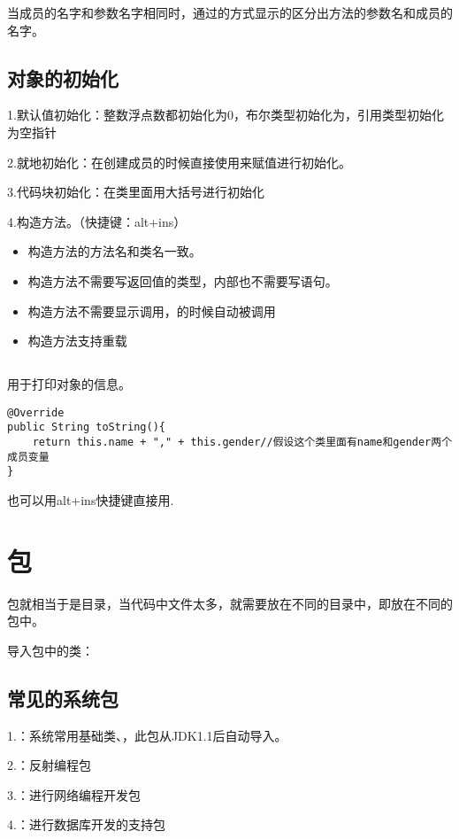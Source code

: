\documentclass[a4paper]{report}
\begin{document}
当成员的名字和参数名字相同时，通过的方式显示的区分出方法的参数名和成员的名字。
\subsection{对象的初始化}
1.默认值初始化：整数浮点数都初始化为0，布尔类型初始化为，引用类型初始化为空指针

2.就地初始化：在创建成员的时候直接使用\dm{=}来赋值进行初始化。

3.代码块初始化：在类里面用大括号进行初始化

4.构造方法。（快捷键：alt+ins）
\begin{itemize}
\itemsep=0pt \parskip =0pt
  \item 构造方法的方法名和类名一致。
  \item 构造方法不需要写返回值的类型，内部也不需要写语句。
  \item 构造方法不需要显示调用，的时候自动被调用
  \item 构造方法支持重载
\end{itemize}

\subsection{}
用于打印对象的信息。
\begin{lstlisting}[title=\dm{toString}方法]
@Override
public String toString(){
    return this.name + "," + this.gender//假设这个类里面有name和gender两个成员变量
}
\end{lstlisting}

也可以用alt+ins快捷键直接用.

\section{包}
包就相当于是目录，当代码中文件太多，就需要放在不同的目录中，即放在不同的包中。

导入包中的类：

\subsection{常见的系统包}
1.：系统常用基础类、，此包从JDK1.1后自动导入。

2.：反射编程包

3.：进行网络编程开发包

4.：进行数据库开发的支持包
\end{document}
